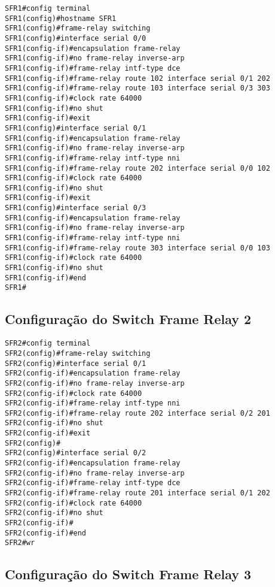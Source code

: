 \documentclass[]{article}
\begin{document}
\begin{verbatim}
SFR1#config terminal
SFR1(config)#hostname SFR1
SFR1(config)#frame-relay switching
SFR1(config)#interface serial 0/0
SFR1(config-if)#encapsulation frame-relay
SFR1(config-if)#no frame-relay inverse-arp
SFR1(config-if)#frame-relay intf-type dce
SFR1(config-if)#frame-relay route 102 interface serial 0/1 202
SFR1(config-if)#frame-relay route 103 interface serial 0/3 303
SFR1(config-if)#clock rate 64000
SFR1(config-if)#no shut
SFR1(config-if)#exit
SFR1(config)#interface serial 0/1
SFR1(config-if)#encapsulation frame-relay
SFR1(config-if)#no frame-relay inverse-arp
SFR1(config-if)#frame-relay intf-type nni
SFR1(config-if)#frame-relay route 202 interface serial 0/0 102
SFR1(config-if)#clock rate 64000
SFR1(config-if)#no shut
SFR1(config-if)#exit
SFR1(config)#interface serial 0/3
SFR1(config-if)#encapsulation frame-relay
SFR1(config-if)#no frame-relay inverse-arp
SFR1(config-if)#frame-relay intf-type nni
SFR1(config-if)#frame-relay route 303 interface serial 0/0 103
SFR1(config-if)#clock rate 64000
SFR1(config-if)#no shut
SFR1(config-if)#end
SFR1#
\end{verbatim}

\subsection{Configuração do Switch Frame Relay
2}\label{configurauxe7uxe3o-do-switch-frame-relay-2}

\begin{verbatim}
SFR2#config terminal
SFR2(config)#frame-relay switching
SFR2(config)#interface serial 0/1
SFR2(config-if)#encapsulation frame-relay
SFR2(config-if)#no frame-relay inverse-arp
SFR2(config-if)#clock rate 64000
SFR2(config-if)#frame-relay intf-type nni
SFR2(config-if)#frame-relay route 202 interface serial 0/2 201
SFR2(config-if)#no shut
SFR2(config-if)#exit
SFR2(config)#
SFR2(config)#interface serial 0/2
SFR2(config-if)#encapsulation frame-relay
SFR2(config-if)#no frame-relay inverse-arp
SFR2(config-if)#frame-relay intf-type dce
SFR2(config-if)#frame-relay route 201 interface serial 0/1 202
SFR2(config-if)#clock rate 64000
SFR2(config-if)#no shut
SFR2(config-if)#
SFR2(config-if)#end
SFR2#wr
\end{verbatim}

\subsection{Configuração do Switch Frame Relay
3}\label{configurauxe7uxe3o-do-switch-frame-relay-3}
\end{document}
